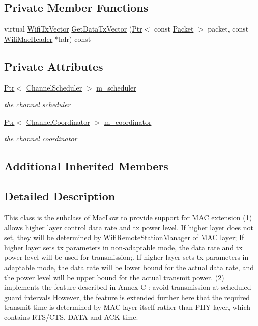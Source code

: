 \subsection*{Private Member Functions}
\begin{DoxyCompactItemize}
\item 
virtual \hyperlink{classns3_1_1WifiTxVector}{Wifi\+Tx\+Vector} \hyperlink{classns3_1_1WaveMacLow_a9f176c853a633679d23d71ac1d5aa908}{Get\+Data\+Tx\+Vector} (\hyperlink{classns3_1_1Ptr}{Ptr}$<$ const \hyperlink{classns3_1_1Packet}{Packet} $>$ packet, const \hyperlink{classns3_1_1WifiMacHeader}{Wifi\+Mac\+Header} $\ast$hdr) const 
\end{DoxyCompactItemize}
\subsection*{Private Attributes}
\begin{DoxyCompactItemize}
\item 
\hyperlink{classns3_1_1Ptr}{Ptr}$<$ \hyperlink{classns3_1_1ChannelScheduler}{Channel\+Scheduler} $>$ \hyperlink{classns3_1_1WaveMacLow_a81d1eed416dfe85b7e79be811a8889f8}{m\+\_\+scheduler}
\begin{DoxyCompactList}\small\item\em the channel scheduler \end{DoxyCompactList}\item 
\hyperlink{classns3_1_1Ptr}{Ptr}$<$ \hyperlink{classns3_1_1ChannelCoordinator}{Channel\+Coordinator} $>$ \hyperlink{classns3_1_1WaveMacLow_a4f562192ac6c5f24ea09027d4a61dc47}{m\+\_\+coordinator}
\begin{DoxyCompactList}\small\item\em the channel coordinator \end{DoxyCompactList}\end{DoxyCompactItemize}
\subsection*{Additional Inherited Members}


\subsection{Detailed Description}
This class is the subclass of \hyperlink{classns3_1_1MacLow}{Mac\+Low} to provide support for M\+AC extension (1) allows higher layer control data rate and tx power level. If higher layer does not set, they will be determined by \hyperlink{classns3_1_1WifiRemoteStationManager}{Wifi\+Remote\+Station\+Manager} of M\+AC layer; If higher layer sets tx parameters in non-\/adaptable mode, the data rate and tx power level will be used for transmission;. If higher layer sets tx parameters in adaptable mode, the data rate will be lower bound for the actual data rate, and the power level will be upper bound for the actual transmit power. (2) implements the feature described in Annex C \+: avoid transmission at scheduled guard intervals However, the feature is extended further here that the required transmit time is determined by M\+AC layer itself rather than P\+HY layer, which contains R\+T\+S/\+C\+TS, D\+A\+TA and A\+CK time. 

